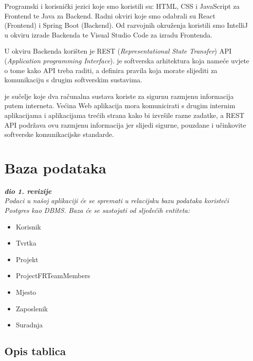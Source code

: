 		{Programski i korisnički jezici koje smo koristili su: HTML, CSS i JavaScript za Frontend te Java za Backend. Radni okviri koje smo odabrali su React (Frontend) i Spring Boot (Backend). Od razvojnih okruženja koristili smo IntelliJ u okviru izrade Backenda te Visual Studio Code za izradu Frontenda.}\vspace{0.3cm}

		{U okviru Backenda korišten je REST (\textit{Representational State Transfer}) API (\textit{Application programming Interface}).  je softverska arhitektura koja nameće uvjete o tome kako API treba raditi, a  definira pravila koja morate slijediti za komunikaciju s drugim softverskim sustavima.}\vspace{0.3cm}

		{ je sučelje koje dva računalna sustava koriste za sigurnu razmjenu informacija putem interneta. Većina Web aplikacija mora komunicirati s drugim internim aplikacijama i aplikacijama trećih strana kako bi izvršile razne zadatke, a REST API podržava ovu razmjenu informacija jer slijedi sigurne, pouzdane i učinkovite softverske komunikacijske standarde.}\pagebreak
		


				
		\section{Baza podataka}
			
			\textbf{\textit{dio 1. revizije}}\\
			
		\textit{Podaci u našoj aplikaciji će se spremati u relacijsku bazu podataka koristeći Postgres kao DBMS. Baza će se sastojati od sljedećih entiteta:}
		\begin{itemize}
			\item Korisnik
			\item Tvrtka
			\item Projekt
			\item ProjectFRTeamMembers
			\item Mjesto
			\item Zaposlenik
			\item Suradnja
		\end{itemize}
			\subsection{Opis tablica}

